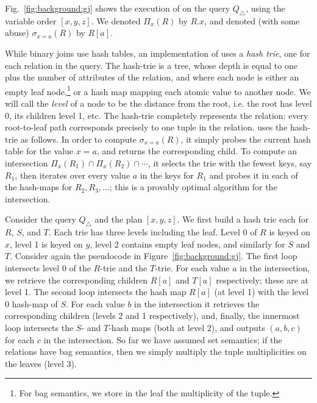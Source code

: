 \begin{example}
  Fig.~\ref{fig:background:gj} shows the execution of \GJ on the
  query $Q_\triangle$, using the variable order $[x,y,z]$.  We denoted
  $\Pi_x(R)$ by $R.x$, and denoted (with some abuse) $\sigma_{x=a}(R)$
  by $R[a]$.
\end{example}


While binary joins use hash tables, an implementation of \GJ uses a
\emph{hash trie}, one for each relation in the query.  The hash-trie
is a tree, whose depth is equal to one plus the number of attributes
of the relation, and where each node is either an empty leaf
node,\footnote{For bag semantics, we store in the leaf the
  multiplicity of the tuple.} or a hash map mapping each atomic value
to another node.  We will call the \emph{level} of a node to be the
distance from the root, i.e. the root has level 0, its children level
1, etc.  The hash-trie completely represents the relation: every
root-to-leaf path corresponds precisely to one tuple in the relation.
\GJ uses the hash-trie as follows.  In order to compute
$\sigma_{x=a}(R)$, it simply probes the current hash table for the
value $x=a$, and returns the corresponding child.  To compute an
intersection $\Pi_x(R_1) \cap \Pi_x(R_2) \cap \cdots$, it selects the
trie with the fewest keys, say $R_1$, then iterates over every value
$a$ in the keys for $R_1$ and probes it in each of the hash-maps for
$R_2, R_3, \ldots$; this is a provably optimal algorithm for the
intersection.

\begin{example}
  Consider the query $Q_\triangle$ and the \GJ plan $[x, y, z]$.  We
  first build a hash trie each for $R$, $S$, and $T$.  Each trie has
  three levels including the leaf.  Level 0 of $R$ is keyed on $x$,
  level 1 is keyed on $y$, level 2 contains empty leaf nodes, and
  similarly for $S$ and $T$.  Consider again the pseudocode in
  Figure~\ref{fig:background:gj}.  The first loop intersects level 0
  of the $R$-trie and the $T$-trie.  For each value $a$ in the
  intersection, we retrieve the corresponding children $R[a]$ and
  $T[a]$ respectively; these are at level 1.  The second loop
  intersects the hash map $R[a]$ (at level 1) with the level 0
  hash-map of $S$.  For each value $b$ in the intersection it
  retrieves the corresponding children (levels 2 and 1 respectively),
  and, finally, the innermost loop intersects the $S$- and $T$-hash
  maps (both at level 2), and outputs $(a,b,c)$ for each $c$ in the
  intersection.  So far we have assumed set semantics; if the
  relations have bag semantics, then we simply multiply the tuple
  multiplicities on the leaves (level 3).
\end{example}

